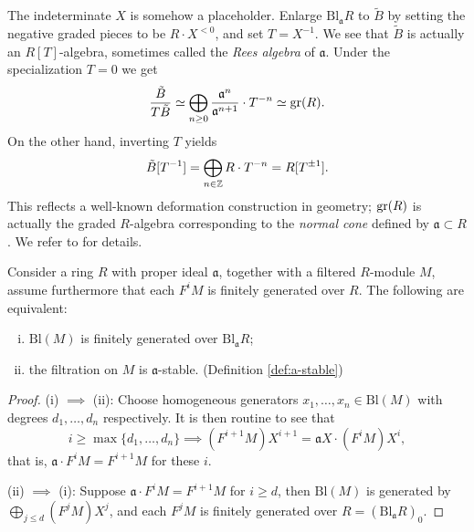 \begin{remark}
	The indeterminate $X$ is somehow a placeholder. Enlarge $\text{Bl}_{\mathfrak{a}} R$ to $\tilde{B}$ by setting the negative graded pieces to be $R \cdot X^{< 0}$, and set $T = X^{-1}$. We see that $\tilde{B}$ is actually an $R[T]$-algebra, sometimes called the \emph{Rees algebra} of $\mathfrak{a}$. Under the specialization $T=0$ we get 
	\[ \frac{ \tilde{B}}{T \tilde{B}} \simeq \bigoplus_{n \geq 0} \frac{\mathfrak{a}^n}{\mathfrak{a}^{n+1}} \cdot T^{-n} \simeq \operatorname{gr}(R). \]
	On the other hand, inverting $T$ yields
	\[ \tilde{B}[T^{-1}] = \bigoplus_{n \in \mathbb{Z}} R \cdot T^{-n} = R[T^{\pm 1}]. \]
	This reflects a well-known deformation construction in geometry; $\operatorname{gr}(R)$ is actually the graded $R$-algebra corresponding to the \emph{normal cone} defined by $\mathfrak{a} \subset R$. We refer to \cite[\S 5.1]{Fu98} for details.
\end{remark}

\begin{lemma}\label{prop:Bl-fg}
	Consider a ring $R$ with proper ideal $\mathfrak{a}$, together with a filtered $R$-module $M$, assume furthermore that each $F^i M$ is finitely generated over $R$. The following are equivalent:
	\begin{enumerate}[(i)]
		\item $\mathrm{Bl}(M)$ is finitely generated over $\mathrm{Bl}_{\mathfrak{a}} R$;
		\item the filtration on $M$ is $\mathfrak{a}$-stable. (Definition \ref{def:a-stable})
	\end{enumerate}
\end{lemma}
\begin{proof}
	(i) $\implies$ (ii): Choose homogeneous generators $x_1, \ldots, x_n \in \text{Bl}(M)$ with degrees $d_1, \ldots, d_n$ respectively. It is then routine to see that
	\[ i \geq \max\{d_1, \ldots, d_n \} \implies (F^{i+1} M) X^{i+1} = \mathfrak{a} X \cdot (F^i M) X^i, \]
	that is, $\mathfrak{a} \cdot F^i M = F^{i+1} M$ for these $i$.

	(ii) $\implies$ (i): Suppose $\mathfrak{a} \cdot F^i M = F^{i+1} M$ for $i \geq d$, then $\text{Bl}(M)$ is generated by $\bigoplus_{j \leq d} (F^j M) X^j$, and each $F^j M$ is finitely generated over $R = (\text{Bl}_{\mathfrak{a}} R)_0$.
\end{proof}

